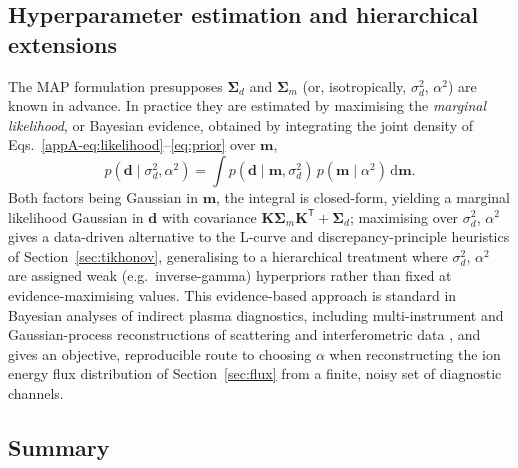 \subsection{Hyperparameter estimation and hierarchical extensions}

The MAP formulation presupposes $\boldsymbol{\Sigma}_{d}$ and $\boldsymbol{\Sigma}_{m}$ (or, isotropically, $\sigma_{d}^{2}$, $\alpha^{2}$) are known in advance. In practice they are estimated by maximising the \emph{marginal likelihood}, or Bayesian evidence, obtained by integrating the joint density of Eqs.~\eqref{appA-eq:likelihood}--\eqref{eq:prior} over $\mathbf{m}$,
\begin{equation}
p(\mathbf{d}\mid\sigma_{d}^{2},\alpha^{2}) = \int p(\mathbf{d}\mid\mathbf{m},\sigma_{d}^{2})\,p(\mathbf{m}\mid\alpha^{2})\,\mathrm{d}\mathbf{m}.
\label{eq:evidence}
\end{equation}
Both factors being Gaussian in $\mathbf{m}$, the integral is closed-form, yielding a marginal likelihood Gaussian in $\mathbf{d}$ with covariance $\mathbf{K}\boldsymbol{\Sigma}_{m}\mathbf{K}^{\mathsf{T}} + \boldsymbol{\Sigma}_{d}$; maximising over $\sigma_{d}^{2}$, $\alpha^{2}$ gives a data-driven alternative to the L-curve and discrepancy-principle heuristics of Section~\ref{sec:tikhonov}, generalising to a hierarchical treatment where $\sigma_{d}^{2}$, $\alpha^{2}$ are assigned weak (e.g.\ inverse-gamma) hyperpriors rather than fixed at evidence-maximising values. This evidence-based approach is standard in Bayesian analyses of indirect plasma diagnostics, including multi-instrument and Gaussian-process reconstructions of scattering and interferometric data \cite{ref0683,ref0685}, and gives an objective, reproducible route to choosing $\alpha$ when reconstructing the ion energy flux distribution of Section~\ref{sec:flux} from a finite, noisy set of diagnostic channels.

\subsection{Summary}

